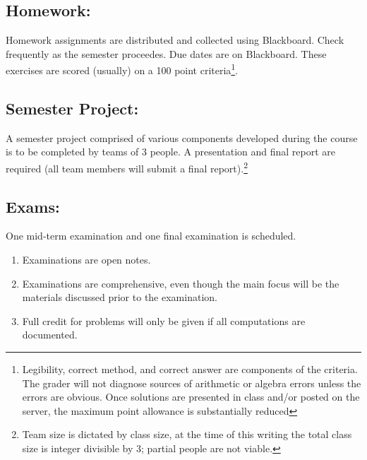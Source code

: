 \documentclass[12pt]{article}
\begin{document}
\subsection*{Homework:} 
Homework assignments are distributed and collected using Blackboard.  Check frequently as the semester proceedes.  Due dates are on Blackboard.  
These exercises are scored (usually) on a 100 point criteria\footnote{Legibility, correct method, and correct answer are components of the criteria.   
The grader will not diagnose sources of arithmetic or algebra errors unless the errors are obvious.  
Once solutions are presented in class and/or posted on the server, the maximum point allowance is substantially reduced}.

\subsection*{Semester Project:}  
A semester project comprised of various components developed during the course is to be completed by teams of 3 people.  
A presentation and final report are required (all team members will submit a final report).\footnote{Team size is dictated by class size, at the time of this writing the total class size is integer divisible by 3; partial people are not viable.}

\subsection*{Exams:} One mid-term examination and one final examination is scheduled.  
\begin{enumerate}
\item Examinations are open notes.
\item Examinations are comprehensive, even though the main focus will be the materials discussed prior to the examination.
\item Full credit for problems will only be given if all computations are documented.
\end{enumerate}
\end{document}
